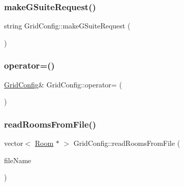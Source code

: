 \mbox{\label{class_grid_config_aa8cd575c3fe49c27603d6925f690049c}} 
\subsubsection{\texorpdfstring{make\+G\+Suite\+Request()}{makeGSuiteRequest()}}
{\footnotesize\ttfamily string Grid\+Config\+::make\+G\+Suite\+Request (\begin{DoxyParamCaption}{ }\end{DoxyParamCaption})\hspace{0.3cm}{\ttfamily [private]}}

\mbox{\label{class_grid_config_a852bde866378360d38d0722bb8c98f01}} 
\subsubsection{\texorpdfstring{operator=()}{operator=()}}
{\footnotesize\ttfamily \hyperlink{class_grid_config}{Grid\+Config}\& Grid\+Config\+::operator= (\begin{DoxyParamCaption}\item[{const \hyperlink{class_grid_config}{Grid\+Config} \&}]{ }\end{DoxyParamCaption})\hspace{0.3cm}{\ttfamily [private]}}

\mbox{\label{class_grid_config_a7772860b1d46afff422f8208fcd45291}} 
\subsubsection{\texorpdfstring{read\+Rooms\+From\+File()}{readRoomsFromFile()}}
{\footnotesize\ttfamily vector$<$ \hyperlink{class_room}{Room} $\ast$ $>$ Grid\+Config\+::read\+Rooms\+From\+File (\begin{DoxyParamCaption}\item[{string}]{file\+Name }\end{DoxyParamCaption})\hspace{0.3cm}{\ttfamily [private]}}

